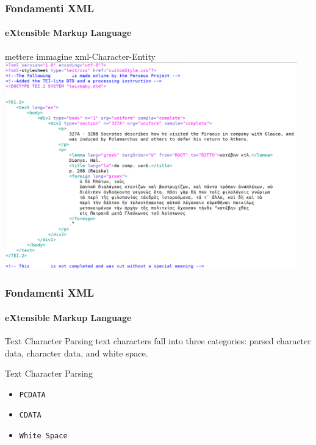 \begin{frame}
	\frametitle{Fondamenti XML}
	\framesubtitle{eXtensible Markup Language}
	\addtocounter{nframe}{1}

	\begin{center}
		mettere immagine xml-Character-Entity
		\includegraphics[width=0.95\textwidth]{imgs/xml-TEI-PerseusExample.png}
	\end{center}

\end{frame}



\begin{frame}
    \frametitle{Fondamenti XML}
    \framesubtitle{eXtensible Markup Language}
    \addtocounter{nframe}{1}

	\begin{block}{Text Character Parsing}
		text characters fall into three categories: parsed character data, character data, and white space.
	\end{block}

	\begin{block}{Text Character Parsing}
		\begin{itemize}
			\item \texttt{PCDATA}
			\item \texttt{CDATA}
			\item \texttt{White Space}
		\end{itemize}
	\end{block}

\end{frame}




